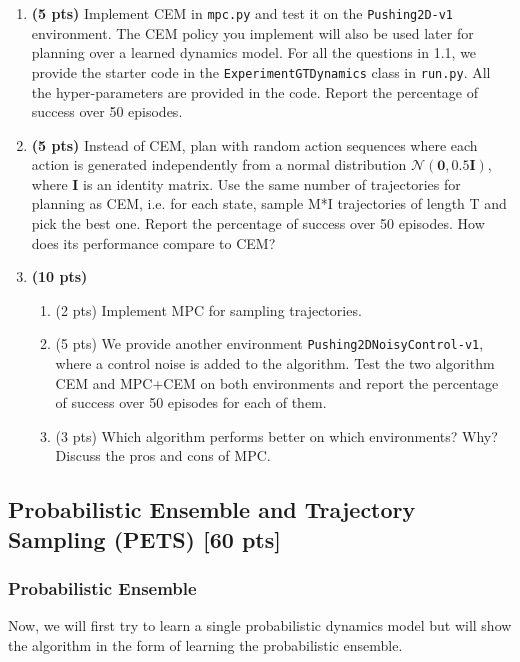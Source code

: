 \documentclass[12pt]{article}
\begin{document}
\begin{enumerate}
\item \textbf{(5 pts)} Implement CEM in \texttt{mpc.py} and test it on the \texttt{Pushing2D-v1} environment. The CEM policy you implement will also be used later for planning over a learned dynamics model. For all the questions in 1.1, we provide the starter code in the \texttt{ExperimentGTDynamics} class in \texttt{run.py}. All the hyper-parameters are provided in the code. Report the percentage of success over 50 episodes. 
\begin{solution}
\end{solution}

\item \textbf{(5 pts)} Instead of CEM, plan with random action sequences where each action is generated independently from a normal distribution $\mathcal{N}(\bm{0}, 0.5\bm{I})$, where $\bm{I}$ is an identity matrix. Use the same number of trajectories for planning as CEM, i.e. for each state, sample M*I trajectories of length T and pick the best one. Report the percentage of success over 50 episodes. How does its performance compare to CEM?
\begin{solution}
\end{solution}

\item \textbf{(10 pts)} 
\begin{enumerate}
\item (2 pts) Implement MPC for sampling trajectories.
\item (5 pts) We provide another environment \texttt{Pushing2DNoisyControl-v1}, where a control noise is added to the algorithm. Test the two algorithm CEM and MPC+CEM on both environments and report the percentage of success over 50 episodes for each of them. 
\item (3 pts) Which algorithm performs better on which environments? Why? Discuss the pros and cons of MPC.
\end{enumerate}
\begin{solution}
\end{solution}

\end{enumerate}

\subsection{Probabilistic Ensemble and Trajectory Sampling (PETS) [60 pts]}
\subsubsection*{Probabilistic Ensemble}
Now, we will first try to learn a single probabilistic dynamics model but will show the algorithm in the form of learning the probabilistic ensemble.
\end{document}

